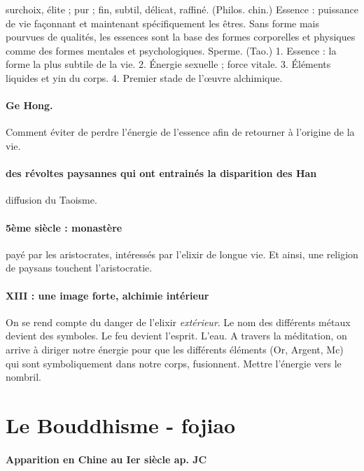 \begin{Def}[jing 精]
    surchoix, élite ; pur ; fin, subtil, délicat, raffiné. (Philos. chin.) Essence : puissance de vie façonnant et maintenant spécifiquement les êtres. Sans forme mais pourvues de qualités, les essences sont la base des formes corporelles et physiques comme des formes mentales et psychologiques. Sperme. (Tao.) 1. Essence : la forme la plus subtile de la vie. 2. Énergie sexuelle ; force vitale. 3. Éléments liquides et yin du corps. 4. Premier stade de l’œuvre alchimique. 
\end{Def}

\paragraph{Ge Hong. } Comment éviter de perdre l'énergie de l'essence afin de retourner à l'origine de la vie. 

\paragraph{des révoltes paysannes qui ont entrainés la disparition des Han} diffusion du Taoisme. 


\paragraph{5ème siècle : monastère} payé par les aristocrates, intéressés par l'elixir de longue vie. Et ainsi, une religion de paysans touchent l'aristocratie. 

\paragraph{XIII : une image forte, alchimie intérieur} On se rend compte du danger de l'elixir \textit{extérieur}. Le nom des différents métaux devient des symboles. Le feu devient l'esprit. L'eau. A travers la méditation, on arrive à diriger notre énergie pour que les différents éléments (Or, Argent, Mc) qui sont symboliquement dans notre corps, fusionnent. Mettre l'énergie vers le nombril.



\section{Le Bouddhisme - fojiao}

\paragraph{Apparition en Chine au Ier siècle ap. JC}


